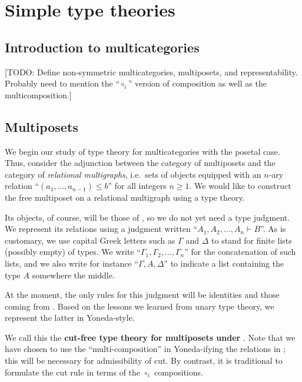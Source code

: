 \documentclass{book}
\let\types\vdash
\begin{document}
\chapter{Simple type theories}
\label{chap:simple}


\section{Introduction to multicategories}
\label{sec:multicats-catth}

[TODO: Define non-symmetric multicategories, multiposets, and representability.
Probably need to mention the ``$\circ_i$'' version of composition as well as the multicomposition.]


\section{Multiposets}
\label{sec:multiposets}

We begin our study of type theory for multicategories with the posetal case.
Thus, consider the adjunction between the category \bMPos of multiposets and the category \bRelMGr of \emph{relational multigraphs}, i.e.\ sets of objects equipped with an $n$-ary relation ``$(a_1,\dots,a_{n-1})\le b$'' for all integers $n\ge 1$.
We would like to construct the free multiposet on a relational multigraph \cG using a type theory.

Its objects, of course, will be those of \cG, so we do not yet need a type judgment.
We represent its relations using a judgment written ``$A_1,A_2,\dots,A_n \types B$''.
As is customary, we use capital Greek letters such as $\Gamma$ and $\Delta$ to stand for finite lists (possibly empty) of types.
We write ``$\Gamma_1,\Gamma_2,\dots,\Gamma_n$'' for the concatenation of such lists, and we also write for instance ``$\Gamma,A,\Delta$'' to indicate a list containing the type $A$ somewhere the middle.

At the moment, the only rules for this judgment will be identities and those coming from \cG.
Based on the lessons we learned from unary type theory, we represent the latter in Yoneda-style.
We call this the \textbf{cut-free type theory for multiposets under \cG}.
Note that we have chosen to use the ``multi-composition'' in Yoneda-ifying the relations in \cG; this will be necessary for admissibility of cut.
By contrast, it is traditional to formulate the cut rule in terms of the $\circ_i$ compositions.
\end{document}
